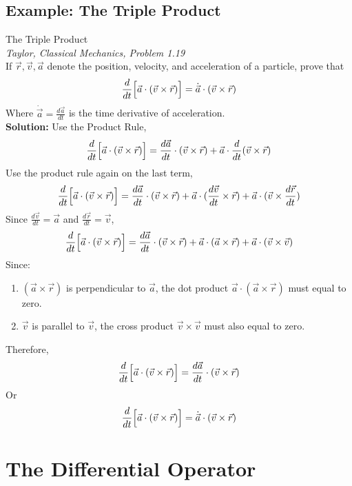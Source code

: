 \documentclass[11pt]{article}
\theoremstyle{gangnamstyle}{\newtheorem{definition}{Definition}[]}
\theoremstyle{gangnamstyle}{\newtheorem{example}{Example}[]}
\theoremstyle{gangnamstyle}{\newtheorem{problem}{Problem}[]}
\begin{document}
\subsection{Example: The Triple Product}
\begin{example}
The Triple Product \\
\textit{Taylor, Classical Mechanics, Problem 1.19} \\
If $\Vec{r}, \Vec{v}, \Vec{a}$ denote the position, velocity, and acceleration of a particle, prove that 
\[ \frac{d}{dt}\Bigl[\Vec{a} \cdot (\Vec{v} \times \Vec{r})\Bigr] = \Dot{\Vec{a}} \cdot (\Vec{v} \times \Vec{r}) \]
Where $\Dot{\Vec{a}} = \frac{d\Vec{a}}{dt}$ is the time derivative of acceleration. \\

\textbf{Solution:} Use the Product Rule, 
\[ \frac{d}{dt}\Bigl[\Vec{a} \cdot (\Vec{v} \times \Vec{r})\Bigr] = \frac{d\Vec{a}}{dt} \cdot (\Vec{v} \times \Vec{r}) + \Vec{a} \cdot \frac{d}{dt}(\Vec{v} \times \Vec{r}) \]
Use the product rule again on the last term, 
\[ \frac{d}{dt}\Bigl[\Vec{a} \cdot (\Vec{v} \times \Vec{r})\Bigr] = \frac{d\Vec{a}}{dt} \cdot (\Vec{v} \times \Vec{r}) + \Vec{a} \cdot (\frac{d\Vec{v}}{dt} \times \Vec{r}) + \Vec{a} \cdot (\Vec{v} \times \frac{d\Vec{r}}{dt}) \]
Since $\frac{d\Vec{v}}{dt} = \Vec{a}$ and $\frac{d\Vec{r}}{dt} = \Vec{v}$, 
\[ \frac{d}{dt}\Bigl[\Vec{a} \cdot (\Vec{v} \times \Vec{r})\Bigr] = \frac{d\Vec{a}}{dt} \cdot (\Vec{v} \times \Vec{r}) + \Vec{a} \cdot (\Vec{a} \times \Vec{r}) + \Vec{a} \cdot (\Vec{v} \times \Vec{v}) \]
Since: 
\begin{enumerate}
\item $(\Vec{a} \times \Vec{r})$ is perpendicular to $\Vec{a}$, the dot product $\Vec{a} \cdot (\Vec{a} \times \Vec{r})$ must equal to zero. 
\item $\Vec{v}$ is parallel to $\Vec{v}$, the cross product $\Vec{v} \times \Vec{v}$ must also equal to zero. 
\end{enumerate}
Therefore, 
\[ \frac{d}{dt}\Bigl[\Vec{a} \cdot (\Vec{v} \times \Vec{r})\Bigr] = \frac{d\Vec{a}}{dt} \cdot (\Vec{v} \times \Vec{r}) \]
Or
\[ \frac{d}{dt}\Bigl[\Vec{a} \cdot (\Vec{v} \times \Vec{r})\Bigr] = \Dot{\Vec{a}} \cdot (\Vec{v} \times \Vec{r}) \]
\end{example}

\section{The Differential Operator}
\end{document}
